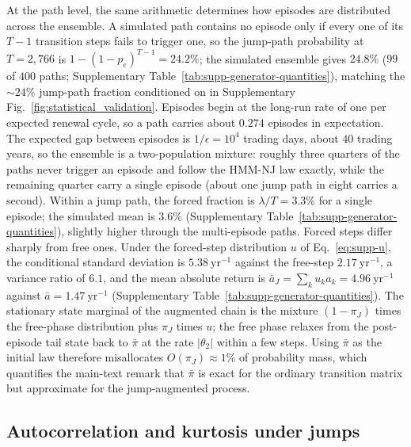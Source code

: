 At the path level, the same arithmetic determines how episodes are
distributed across the ensemble. A simulated path contains no episode
only if every one of its $T - 1$ transition steps fails to trigger
one, so the jump-path probability at $T = 2{,}766$ is
$1 - (1 - p_e)^{T-1} = 24.2\%$; the simulated ensemble
gives $24.8\%$ ($99$ of $400$ paths;
Supplementary Table~\ref{tab:supp-generator-quantities}), matching the $\sim\!24\%$
jump-path fraction conditioned on in
Supplementary Fig.~\ref{fig:statistical_validation}. Episodes begin
at the long-run rate of one per expected renewal cycle, so a path
carries about $0.274$ episodes in expectation. The expected gap
between episodes is $1/\epsilon = 10^4$ trading days, about $40$
trading years, so the ensemble is a two-population mixture: roughly
three quarters of the paths never trigger an episode and follow the
HMM-NJ law exactly, while the remaining quarter carry a single
episode (about one jump path in eight carries a second). Within a
jump path, the forced fraction is $\lambda / T = 3.3\%$ for a single
episode; the simulated mean is $3.6\%$
(Supplementary Table~\ref{tab:supp-generator-quantities}), slightly higher through the
multi-episode paths. Forced steps differ sharply from free ones. Under
the forced-step distribution $u$ of Eq.~\eqref{eq:supp-u}, the
conditional standard deviation is $5.38~\mathrm{yr}^{-1}$ against the
free-step $2.17~\mathrm{yr}^{-1}$, a variance ratio of $6.1$, and the
mean absolute return is $\bar a_J = \sum_k u_k a_k =
4.96~\mathrm{yr}^{-1}$ against $\bar a = 1.47~\mathrm{yr}^{-1}$
(Supplementary Table~\ref{tab:supp-generator-quantities}). The
stationary state marginal of the augmented chain is the mixture
$(1 - \pi_J)$ times the free-phase distribution plus $\pi_J$ times
$u$; the free phase relaxes from the post-episode tail state back to
$\bar\pi$ at the rate $|\theta_2|$ within a few steps. Using
$\bar\pi$ as the initial law therefore misallocates $O(\pi_J) \approx
1\%$ of probability mass, which quantifies the main-text remark that
$\bar\pi$ is exact for the ordinary transition matrix but approximate
for the jump-augmented process.

\subsection{Autocorrelation and kurtosis under jumps}
\label{sec:supp-gen-tuning}

